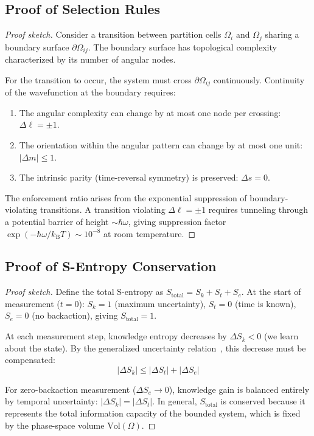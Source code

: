 \documentclass[aps,prx,superscriptaddress,twocolumn,10pt,a4paper,longbibliography,preprint]{revtex4-2}
\newcommand{\kB}{k_{\mathrm{B}}}
\theoremstyle{definition}
\theoremstyle{remark}
\begin{document}
\subsection{Proof of Selection Rules}

\begin{proof}[Proof sketch]
Consider a transition between partition cells $\Omega_i$ and $\Omega_j$ sharing a boundary surface $\partial\Omega_{ij}$. The boundary surface has topological complexity characterized by its number of angular nodes.

For the transition to occur, the system must cross $\partial\Omega_{ij}$ continuously. Continuity of the wavefunction at the boundary requires:
\begin{enumerate}
\item The angular complexity can change by at most one node per crossing: $\Delta\ell = \pm 1$.
\item The orientation within the angular pattern can change by at most one unit: $|\Delta m| \leq 1$.
\item The intrinsic parity (time-reversal symmetry) is preserved: $\Delta s = 0$.
\end{enumerate}

The enforcement ratio arises from the exponential suppression of boundary-violating transitions. A transition violating $\Delta\ell = \pm 1$ requires tunneling through a potential barrier of height $\sim \hbar\omega$, giving suppression factor $\exp(-\hbar\omega/\kB T) \sim 10^{-8}$ at room temperature.
\end{proof}

\subsection{Proof of S-Entropy Conservation}

\begin{proof}[Proof sketch]
Define the total S-entropy as $S_{\text{total}} = S_k + S_t + S_e$. At the start of measurement ($t = 0$): $S_k = 1$ (maximum uncertainty), $S_t = 0$ (time is known), $S_e = 0$ (no backaction), giving $S_{\text{total}} = 1$.

At each measurement step, knowledge entropy decreases by $\Delta S_k < 0$ (we learn about the state). By the generalized uncertainty relation~\cite{Ozawa2003}, this decrease must be compensated:
\begin{equation}
|\Delta S_k| \leq |\Delta S_t| + |\Delta S_e|
\end{equation}

For zero-backaction measurement ($\Delta S_e \to 0$), knowledge gain is balanced entirely by temporal uncertainty: $|\Delta S_k| = |\Delta S_t|$. In general, $S_{\text{total}}$ is conserved because it represents the total information capacity of the bounded system, which is fixed by the phase-space volume $\mathrm{Vol}(\Omega)$.
\end{proof}
\end{document}
